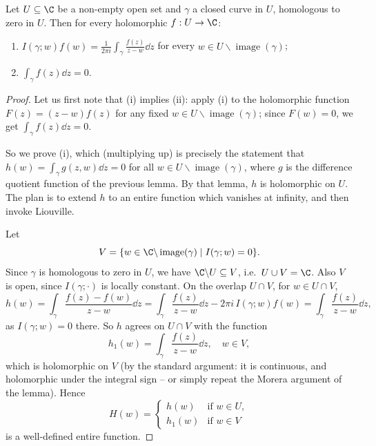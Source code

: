 \begin{theorem}
    Let $U \subseteq \C$ be a non-empty open set and $\gamma$ a closed curve in $U$, homologous to zero in $U$. Then for every holomorphic $f: U \rightarrow \C$:
    \begin{enumerate}[label=(\roman*)]
        \item $\displaystyle I(\gamma; w)f(w) = \frac{1}{2 \pi i} \int_\gamma \frac{f(z)}{z - w} \dd z$ for every $w \in U \backslash \operatorname{image}(\gamma)$;
        \item $\displaystyle\int_\gamma f(z) \dd z = 0$.
    \end{enumerate}
\end{theorem}
\begin{proof}
    Let us first note that (i) implies (ii): apply (i) to the holomorphic function $F(z) = (z - w)f(z)$ for any fixed $w \in U \backslash \operatorname{image}(\gamma)$; since $F(w) = 0$, we get $\int_\gamma f(z) \dd z = 0$.

    So we prove (i), which (multiplying up) is precisely the statement that $h(w) = \int_\gamma g(z, w) \dd z = 0$ for all $w \in U \backslash \operatorname{image}(\gamma)$, where $g$ is the difference quotient function of the previous lemma. By that lemma, $h$ is holomorphic on $U$. The plan is to extend $h$ to an entire function which vanishes at infinity, and then invoke Liouville.

    Let
    $$
    V = \{w \in \C \backslash \operatorname{image}(\gamma) \mid I(\gamma; w) = 0\}.
    $$
    Since $\gamma$ is homologous to zero in $U$, we have $\C \backslash U \subseteq V$, i.e.\ $U \cup V = \C$. Also $V$ is open, since $I(\gamma; \cdot)$ is locally constant. On the overlap $U \cap V$, for $w \in U \cap V$,
    $$
    h(w) = \int_\gamma \frac{f(z) - f(w)}{z - w} \dd z = \int_\gamma \frac{f(z)}{z - w} \dd z - 2 \pi i \, I(\gamma; w) f(w) = \int_\gamma \frac{f(z)}{z - w} \dd z,
    $$
    as $I(\gamma; w) = 0$ there. So $h$ agrees on $U \cap V$ with the function
    $$
    h_1(w) = \int_\gamma \frac{f(z)}{z - w} \dd z, \quad w \in V,
    $$
    which is holomorphic on $V$ (by the standard argument: it is continuous, and holomorphic under the integral sign -- or simply repeat the Morera argument of the lemma). Hence
    $$
    H(w) = \begin{cases}
        h(w) &\mbox{if } w \in U, \\
        h_1(w) &\mbox{if } w \in V
       \end{cases}
    $$
    is a well-defined entire function.


\end{proof}
